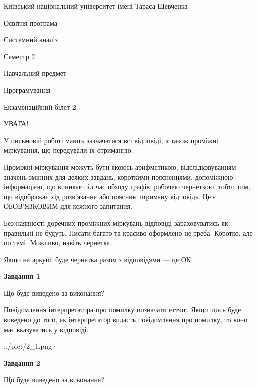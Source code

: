 \documentclass[12pt, ukrainian]{article}
\begin{document}
{{\begin {small}\par
{ \center  Київський національний університет імені Тараса Шевченка \par}
{\parbox {5 cm}{Освітня програма \hfill}{\parbox {7 cm}{Системний аналіз \hfill}}\parbox {6 cm}{\hfill Семестр 2}}\par
{\parbox {5 cm} {Навчальний предмет \hfill}\parbox {7 cm}{Програмування \hfill}\parbox {6cm}{\hfill}\par}\vspace{-7pt} \end{small}}{\center Екзаменаційний білет \No \textbf
{ 2 }\par}}
{
\begin {large}
УВАГА!

У письмовій роботі мають зазначатися всі відповіді, а також проміжні міркування, що передували їх отриманню.

Проміжні міркування можуть бути якоюсь арифметикою, відслідковуванням зна\-чень змінних для деяких завдань,
короткими поясненнями, допоміжною інформацією, що виникає під час обходу графів, робочею чернеткою,
тобто тим, що відображає хід розв’язання або пояснює отриману відповідь.
Це є ОБОВ’ЯЗКОВИМ для кожного запитання.

Без наявності доречних проміжних міркувань відповіді зараховуватись як правиль\-ні не будуть.
Писати багато та красиво оформлено не треба. Коротко, але по темі. Можли\-во, навіть чернетка.

Якщо на аркуші буде чернетка разом з відповідями --- це ОК.

\newpage

{\begin {center}\textbf{Завдання 1}\end {center}}\par
Що буде виведено за виконання?

Повідомлення інтерпретатора про помилку позначати \textbf{error}.
Якщо щось буде виведено до того, як інтерпретатор видасть повідомлення про помилку, 
то воно має вказуватись у відповіді. \par


\begin{center}
	{../pict/2_1.png}
\end{center}
\newpage

{\begin {center}\textbf{Завдання 2}\end {center}}\par
Що буде виведено за виконання?


\end{large}}
\end{document}
